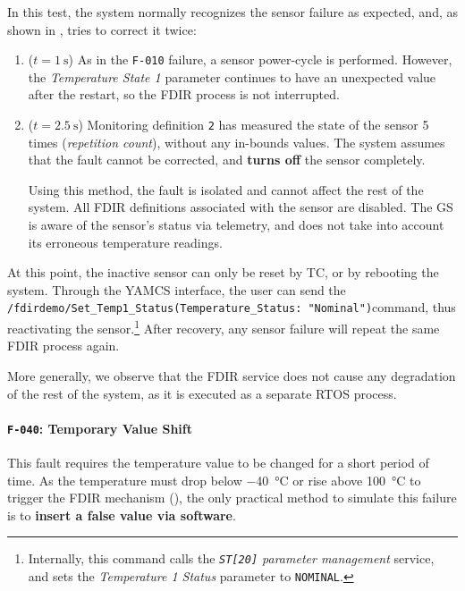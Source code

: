 \documentclass[a4paper,nobib,final]{tufte-book}
\begin{document}
In this test, the system normally recognizes the sensor failure as expected, and, as shown in , tries to correct it twice:
\begin{enumerate}
	\item (\( t = \SI{1}{\second}\)) As in the \texttt{F-010} failure, a sensor power-cycle is performed. However, the \emph{Temperature State 1} parameter continues to have an unexpected value after the restart, so the \acs{FDIR} process is not interrupted.
\item (\(t = \SI{2.5}{\second}\)) Monitoring definition \texttt{2} has measured the state of the sensor 5 times (\emph{repetition count}), without any in-bounds values. The system assumes that the fault cannot be corrected, and \textbf{turns off} the sensor completely.

Using this method, the fault is isolated and cannot affect the rest of the system. All \acs{FDIR} definitions associated with the sensor are disabled. The \acl{GS} is aware of the sensor's status via telemetry, and does not take into account its erroneous temperature readings.
\end{enumerate}

At this point, the inactive sensor can only be reset by \acs{TC}, or by rebooting the system. Through the \acs{YAMCS} interface, the user can send the \texttt{/fdirdemo/Set_Temp1_Status(Temperature_Status: "Nominal")}\linebreak[4] command, thus reactivating the sensor.\footnote[][-3ex]{Internally, this command calls the \emph{\texttt{ST[20]} parameter management} service, and sets the \emph{Temperature 1 Status} parameter to \texttt{NOMINAL}.} After recovery, any sensor failure will repeat the same \acs{FDIR} process again.

More generally, we observe that the \acs{FDIR} service does not cause any degradation of the rest of the system, as it is executed as a separate \acs{RTOS} process.

\clearpage
\paragraph{\textbf{\texttt{F-040}: Temporary Value Shift}}\hspace{0pt}

This fault requires the temperature value to be changed for a short period of time. As the temperature must drop below \SI{-40}{\celsius} or rise above \SI{100}{\celsius} to trigger the \acs{FDIR} mechanism (), the only practical method to simulate this failure is to \textbf{insert a false value via software}.
\end{document}

